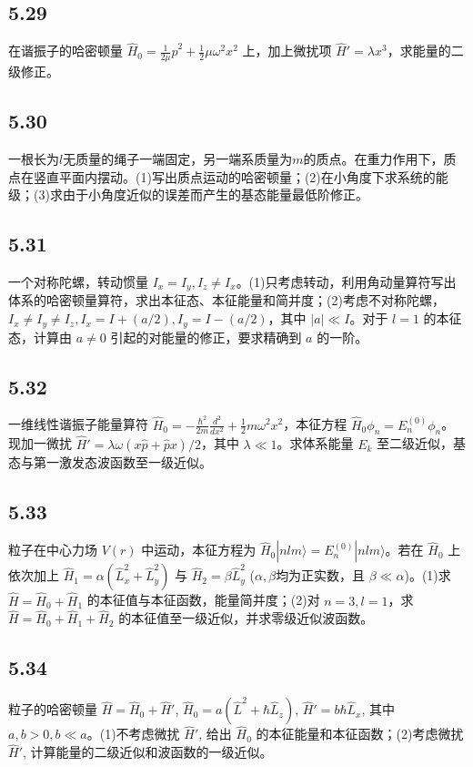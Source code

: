 \subsection{5.29}
在谐振子的哈密顿量 $ \hat{H}_0 = \frac{1}{2\mu} \hat{p}^2 + \frac{1}{2} \mu \omega^2 x^2 $ 上，加上微扰项 $ \hat{H}' = \lambda x^3 $，求能量的二级修正。

\subsection{5.30}
一根长为$l$无质量的绳子一端固定，另一端系质量为$m$的质点。在重力作用下，质点在竖直平面内摆动。(1)写出质点运动的哈密顿量；(2)在小角度下求系统的能级；(3)求由于小角度近似的误差而产生的基态能量最低阶修正。

\subsection{5.31}
一个对称陀螺，转动惯量 $I_x = I_y, I_z \neq I_x$。(1)只考虑转动，利用角动量算符写出体系的哈密顿量算符，求出本征态、本征能量和简并度；(2)考虑不对称陀螺，$I_x \neq I_y \neq I_z, I_x = I + (a/2), I_y = I - (a/2)$，其中 $|a| \ll I$。对于 $l = 1$ 的本征态，计算由 $a \neq 0$ 引起的对能量的修正，要求精确到 $a$ 的一阶。

\subsection{5.32}
一维线性谐振子能量算符 $\hat{H}_0 = -\frac{\hbar^2}{2m}\frac{d^2}{dx^2} + \frac{1}{2} m\omega^2 x^2$，本征方程
$\hat{H}_0 \phi_n = E_n^{(0)} \phi_n$。现加一微扰 $\hat{H}' = \lambda \omega(x\hat{p} + \hat{p}x)/2$，其中 $\lambda \ll 1$。求体系能量 $E_k$ 至二级近似，基态与第一激发态波函数至一级近似。

\subsection{5.33}
粒子在中心力场 $V(r)$ 中运动，本征方程为 $\hat{H}_0 | nlm \rangle = E^{(0)}_n | nlm \rangle$。若在 $\hat{H}_0$ 上依次加上 $\hat{H}_1 = \alpha (\hat{L}^2_x + \hat{L}^2_y)$ 与 $\hat{H}_2 = \beta \hat{L}^2_y$ ($\alpha, \beta$均为正实数，且 $\beta \ll \alpha$)。(1)求 $\hat{H} = \hat{H}_0 + \hat{H}_1$ 的本征值与本征函数，能量简并度；(2)对 $n = 3,l = 1$，求 $\hat{H} = \hat{H}_0 + \hat{H}_1 + \hat{H}_2$ 的本征值至一级近似，并求零级近似波函数。

\subsection{5.34}
粒子的哈密顿量 $\hat{H} = \hat{H}_0 + \hat{H}'$, $\hat{H}_0 = a (\hat{L}^2 + \hbar \hat{L}_z)$, $\hat{H}' = b \hbar \hat{L}_x$, 其中 $a, b > 0, b \ll a$。(1)不考虑微扰 $\hat{H}'$, 给出 $\hat{H}_0$ 的本征能量和本征函数；(2)考虑微扰 $\hat{H}'$, 计算能量的二级近似和波函数的一级近似。

